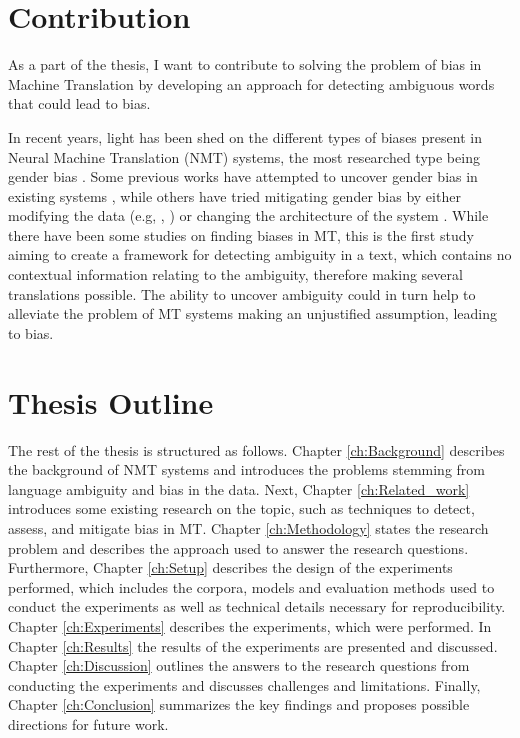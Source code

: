 
\section{Contribution}
\label{sec:Introduction:Contribution}

As a part of the thesis, I want to contribute to solving the problem of bias in Machine Translation by developing an approach for detecting ambiguous words that could lead to bias. 

In recent years, light has been shed on the different types of biases present in Neural Machine Translation (NMT) systems, the most researched type being gender bias \parencite{Savoldi_2021}. Some previous works have attempted to uncover gender bias in existing systems \parencite{Prates_2019}, while others have tried mitigating gender bias by either modifying the data (e.g, \citet{Escud_Font_2019}, \citet{Stanovsky_2019}) or changing the architecture of the system \parencite{Vanmassenhove_2018}. While there have been some studies on finding biases in MT, this is the first study aiming to create a framework for detecting ambiguity in a text, which contains no contextual information relating to the ambiguity, therefore making several translations possible. The ability to uncover ambiguity could in turn help to alleviate the problem of MT systems making an unjustified assumption, leading to bias.


\section{Thesis Outline}
\label{sec:Introduction:Outline}
The rest of the thesis is structured as follows. Chapter \ref{ch:Background} describes the background of NMT systems and introduces the problems stemming from language ambiguity and bias in the data. Next, Chapter \ref{ch:Related_work} introduces some existing research on the topic, such as techniques to detect, assess, and mitigate bias in MT. Chapter \ref{ch:Methodology} states the research problem and describes the approach used to answer the research questions. Furthermore, Chapter \ref{ch:Setup} describes the design of the experiments performed, which includes the corpora, models and evaluation methods used to conduct the experiments as well as technical details necessary for reproducibility. Chapter \ref{ch:Experiments} describes the experiments, which were performed. In Chapter \ref{ch:Results} the results of the experiments are presented and discussed. Chapter \ref{ch:Discussion} outlines the answers to the research questions from conducting the experiments and discusses challenges and limitations. Finally, Chapter \ref{ch:Conclusion} summarizes the key findings and proposes possible directions for future work.
